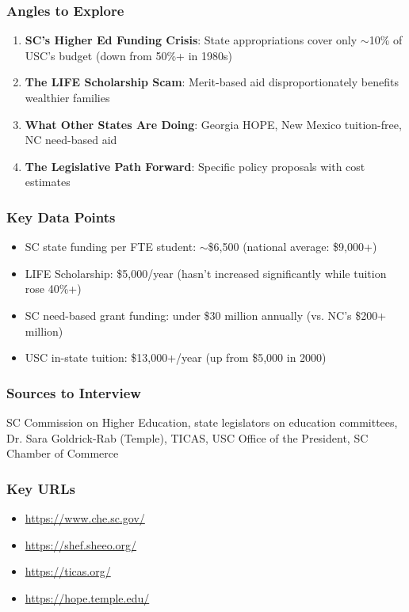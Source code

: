 \documentclass[11pt,letterpaper]{article}
\begin{document}
\subsubsection*{Angles to Explore}
\begin{enumerate}[noitemsep]
    \item \textbf{SC's Higher Ed Funding Crisis}: State appropriations cover only $\sim$10\% of USC's budget (down from 50\%+ in 1980s)
    \item \textbf{The LIFE Scholarship Scam}: Merit-based aid disproportionately benefits wealthier families
    \item \textbf{What Other States Are Doing}: Georgia HOPE, New Mexico tuition-free, NC need-based aid
    \item \textbf{The Legislative Path Forward}: Specific policy proposals with cost estimates
\end{enumerate}

\subsubsection*{Key Data Points}
\begin{itemize}[noitemsep]
    \item SC state funding per FTE student: $\sim$\$6,500 (national average: \$9,000+)
    \item LIFE Scholarship: \$5,000/year (hasn't increased significantly while tuition rose 40\%+)
    \item SC need-based grant funding: under \$30 million annually (vs. NC's \$200+ million)
    \item USC in-state tuition: \$13,000+/year (up from \$5,000 in 2000)
\end{itemize}

\subsubsection*{Sources to Interview}
SC Commission on Higher Education, state legislators on education committees, Dr. Sara Goldrick-Rab (Temple), TICAS, USC Office of the President, SC Chamber of Commerce

\subsubsection*{Key URLs}
\begin{itemize}[noitemsep]
    \item \url{https://www.che.sc.gov/}
    \item \url{https://shef.sheeo.org/}
    \item \url{https://ticas.org/}
    \item \url{https://hope.temple.edu/}
\end{itemize}
\end{document}
